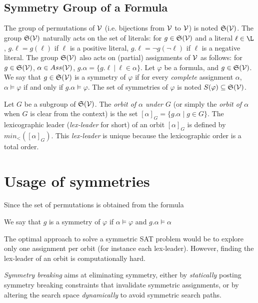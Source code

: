 \\
\\



\subsection{Symmetry Group of a Formula}

The group of permutations of $\mathcal{V}$ (i.e. bijections from $\mathcal{V}$ to $\mathcal{V}$) is noted
$\mathfrak{S}(\mathcal{V})$. The group $\mathfrak{S}(\mathcal{V})$ naturally acts on the set of literals: for $g
\in \mathfrak{S}(\mathcal{V})$ and a literal $\ell \in \L $, $g.\ell = g(\ell)$ if $\ell$ is a
positive literal, $g.\ell = \neg g(\neg \ell)$ if $\ell$ is a negative literal.
The group $\mathfrak{S}(\mathcal{V})$ also acts on (partial) assignments of $\mathcal{V}$ as follows: for
$g \in \mathfrak{S}(\mathcal{V})$, $\alpha \in Ass(\mathcal{V})$, $g.\alpha = \{ g.\ell ~|~ \ell \in \alpha \}$. Let
$\varphi$ be a formula, and $g \in \mathfrak{S}(\mathcal{V})$. We say that $g\in \mathfrak{S}(\mathcal{V})$ is a
symmetry of $ \varphi$ if for every \emph{complete} assignment $\alpha$, $\alpha
\models \varphi$ if and only if $g.\alpha \models \varphi$. The set of symmetries
of $\varphi$ is noted $S(\varphi) \subseteq \mathfrak{S}(\mathcal{V})$.

Let $G$ be a subgroup of $\mathfrak{S}(\mathcal{V})$. The \emph{orbit of $\alpha$ under $G$} (or
simply the \emph{orbit of $\alpha$} when $G$ is clear from the context) is the set
$ [\alpha]_G=\{ g.\alpha \mid g \in G \}$. The lexicographic leader
(\textit{lex-leader} for short) of an orbit $[\alpha]_G$ is defined by
$min_<([\alpha]_G)$. This \textit{lex-leader} is unique because the lexicographic
order is a total order.


\section{Usage of symmetries}

Since the set of permutations is obtained from the formula

We say that $g$ is a symmetry of $\varphi$ if $\alpha \models \varphi$ and $ g.\alpha \models \alpha$


The optimal approach to solve a symmetric SAT problem would be to explore
only one assignment per orbit (for instance each lex-leader). However, finding the
lex-leader of an orbit is computationally hard.


\emph{Symmetry breaking} aims at eliminating symmetry, either
by \emph{statically} posting symmetry breaking constraints that invalidate symmetric
assignments, or by altering the search space \emph{dynamically} to avoid symmetric search paths.


